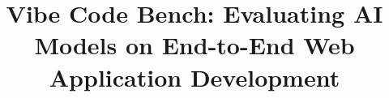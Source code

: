 \documentclass[sigconf,review,anonymous]{acmart}
\begin{document}
\title{Vibe Code Bench: Evaluating AI Models on End-to-End Web Application Development}


\end{document}
